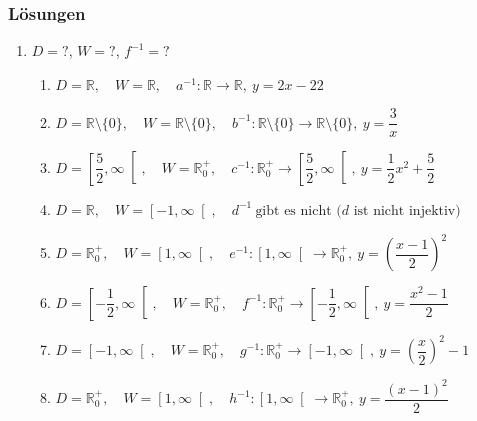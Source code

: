 \subsubsection{Lösungen}
\begin{enumerate}
    \item $D = ?$, $W = ?$, $f^{-1} = ?$
          \begin{enumerate}
              \item $D=\mathbb{R},\quad W=\mathbb{R},\quad
                        a^{-1}:\mathbb{R}\to\mathbb{R},\ y=2x-22$
              \item $D=\mathbb{R}\setminus\{0\},\quad W=\mathbb{R}\setminus\{0\},\quad
                        b^{-1}:\mathbb{R}\setminus\{0\}\to\mathbb{R}\setminus\{0\},\ y=\dfrac{3}{x}$
              \item $D=\left[\dfrac{5}{2},\infty\right[,\quad W=\mathbb{R}_0^{+},\quad
                        c^{-1}:\mathbb{R}_0^{+}\to\left[\dfrac{5}{2},\infty\right[,\ y=\dfrac{1}{2}x^{2}+\dfrac{5}{2}$
              \item $D=\mathbb{R},\quad W=\left[-1,\infty\right[, \quad
                        d^{-1}\ \text{gibt es nicht (}d\text{ ist nicht injektiv)}$
              \item $D=\mathbb{R}_0^{+},\quad W=\left[1,\infty\right[, \quad
                        e^{-1}:\left[1,\infty\right[\to\mathbb{R}_0^{+},\ y=\left(\dfrac{x-1}{2}\right)^{2}$
              \item $D=\left[-\dfrac{1}{2},\infty\right[,\quad W=\mathbb{R}_0^{+},\quad
                        f^{-1}:\mathbb{R}_0^{+}\to\left[-\dfrac{1}{2},\infty\right[,\ y=\dfrac{x^{2}-1}{2}$
              \item $D=\left[-1,\infty\right[,\quad W=\mathbb{R}_0^{+},\quad
                        g^{-1}:\mathbb{R}_0^{+}\to\left[-1,\infty\right[,\ y=\left(\dfrac{x}{2}\right)^{2}-1$
              \item $D=\mathbb{R}_0^{+},\quad W=\left[1,\infty\right[,\quad
                        h^{-1}:\left[1,\infty\right[\to\mathbb{R}_0^{+},\ y=\dfrac{(x-1)^{2}}{2}$
          \end{enumerate}


\end{enumerate}
